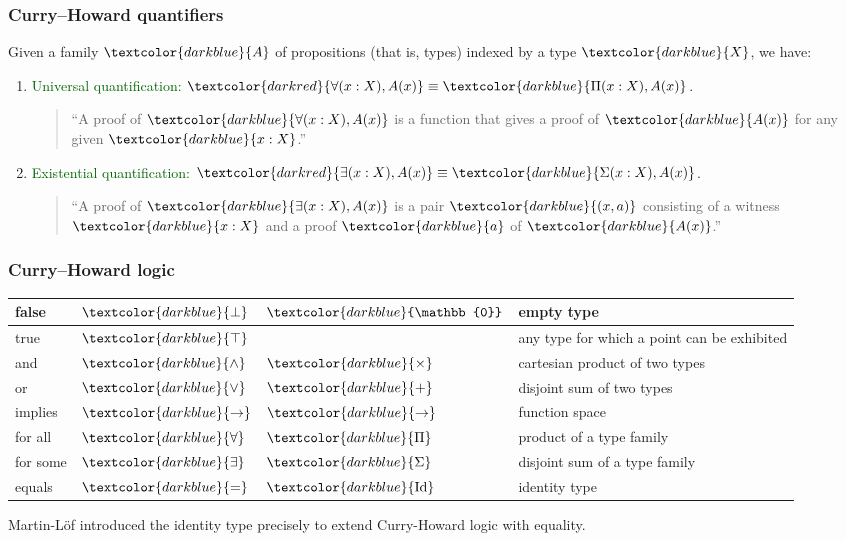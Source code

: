 \documentclass[aspectratio=169]{beamer}
\newcommand{\eqq}{\equiv}
\newcommand{\db}{\textcolor{darkblue}}
\newcommand{\dg}{\textcolor{darkgreen}}
\newcommand{\dr}{\textcolor{darkred}}
\newcommand{\m}[1]{$\db{#1}$}
\newcommand{\mm}[1]{${#1}$}
\newcommand{\Id}{\operatorname{Id}}
\begin{document}
\begin{frame}
  \frametitle{Curry--Howard quantifiers}

Given a family \m{A} of propositions (that is, types) indexed by a type \m{X}, we have:
\begin{enumerate}
\vfill \item \dg{Universal quantification:} \quad \mm{\dr{\forall(x:X), A(x)} \eqq \db{\Pi(x:X), A(x)}}.

\vfill

\begin{quote}
  ``A proof of \m{\forall(x:X), A(x)} is a function that gives a proof of \m{A(x)} for any given \m{x:X}.''
\end{quote}


\vfill \item \dg{Existential quantification:} \quad \mm{\dr{\exists(x:X), A(x)} \eqq \db{\Sigma(x:X), A(x)}}.

\vfill

\begin{quote}
  ``A proof of \m{\exists(x:X), A(x)} is a pair \m{(x,a)}  consisting of a witness \m{x:X} and a proof \m{a} of \m{A(x)}.''
\end{quote}

\end{enumerate}

\end{frame}

\begin{frame}
  \frametitle{Curry--Howard logic}

  \begin{tabular}{|| l | l | l | l ||}
    \hline \hline
    false &  \m{\bot}         & \m{\mathbb{0}}  & empty type \\ \hline
    true &  \m{\top}        & \  & any type for which a point can be exhibited \\ \hline
    and &  \m{\wedge} & \m{\times} & cartesian product of two types \\ \hline
    or &  \m{\vee} & \m{+} & disjoint sum of two types \\ \hline
    implies  & \m{\to} & \m{\to} & function space \\ \hline
    for all  & \m{\forall} & \m{\Pi} & product of a type family \\ \hline
    for some &  \m{\exists} & \m{\Sigma} & disjoint sum of a type family \\ \hline
equals & \m{=} & \m{\Id} & identity type \\ \hline
    \hline
  \end{tabular}

\vfill

Martin-L\"of introduced the identity type precisely to extend
Curry-Howard logic with equality.

\end{frame}
\end{document}
